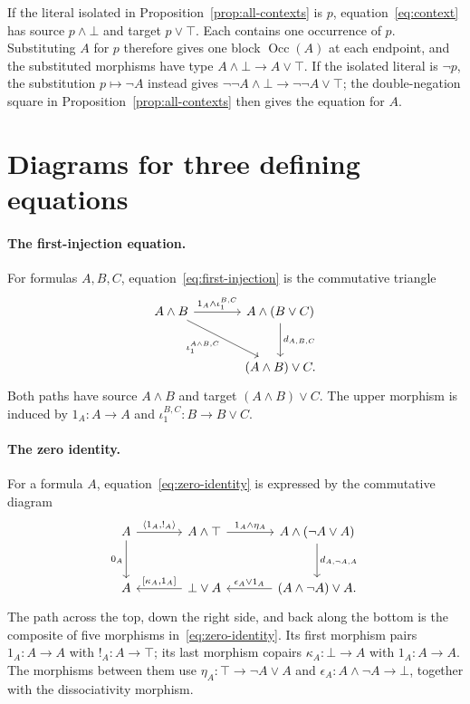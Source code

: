 \documentclass[11pt]{article}
\newcommand{\Occ}{\operatorname{Occ}}
\begin{document}
If the literal isolated in Proposition~\ref{prop:all-contexts}
is $p$, equation~\eqref{eq:context} has source $p\wedge\bot$ and
target $p\vee\top$. Each contains one occurrence of $p$. Substituting $A$ for $p$
therefore gives one block $\Occ(A)$ at each endpoint, and the
substituted morphisms have type $A\wedge\bot\to A\vee\top$. If the isolated literal is $\neg p$,
the substitution $p\mapsto\neg A$ instead gives
$\neg\neg A\wedge\bot\to\neg\neg A\vee\top$; the
double-negation square in Proposition~\ref{prop:all-contexts}
then gives the equation for $A$.

\section{Diagrams for three defining equations}
\label{app:structural-diagrams}

\paragraph{The first-injection equation.}
For formulas $A,B,C$, equation~\eqref{eq:first-injection} is the
commutative triangle
\[
\begin{tikzcd}[column sep=large,row sep=large]
 A\wedge B
   \arrow[r,"1_A\wedge\iota_1^{B,C}"]
   \arrow[dr,"{\iota_1^{A\wedge B,C}}"']
   &A\wedge(B\vee C)\arrow[d,"d_{A,B,C}"]\\
   &(A\wedge B)\vee C.
\end{tikzcd}
\]
Both paths have source $A\wedge B$ and target $(A\wedge B)\vee C$.
The upper morphism is induced by $1_A:A\to A$ and
$\iota_1^{B,C}:B\to B\vee C$.

\paragraph{The zero identity.}
For a formula $A$, equation~\eqref{eq:zero-identity} is expressed by
the commutative diagram
\[
\begin{tikzcd}[column sep=large,row sep=large]
 A\arrow[r,"{\langle1_A,!_A\rangle}"]\arrow[d,"0_A"']
   &A\wedge\top\arrow[r,"1_A\wedge\eta_A"]
   &A\wedge(\neg A\vee A)\arrow[d,"d_{A,\neg A,A}"]\\
 A
   &\bot\vee A\arrow[l,"{[\kappa_A,1_A]}"']
   &(A\wedge\neg A)\vee A\arrow[l,"\epsilon_A\vee1_A"'].
\end{tikzcd}
\]
The path across the top, down the right side, and back along the
bottom is the composite of five morphisms in~\eqref{eq:zero-identity}.
Its first morphism pairs $1_A:A\to A$ with $!_A:A\to\top$;
its last morphism copairs $\kappa_A:\bot\to A$ with $1_A:A\to A$.
The morphisms between them use
$\eta_A:\top\to\neg A\vee A$ and
$\epsilon_A:A\wedge\neg A\to\bot$, together with the dissociativity morphism.
\end{document}
